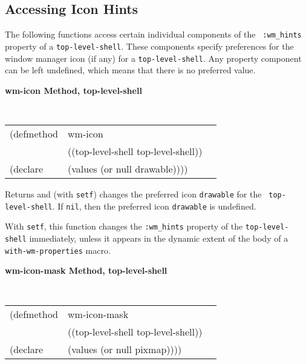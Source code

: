 \documentclass[twoside]{book}
\begin{document}
\begin{sloppy}
\begin{flushright}
{}\end{flushright}


{\samepage
\subsection*{Accessing Icon Hints} 

The following functions access certain individual components of the {\tt
:wm\_hints} property of a {\tt top\--level\--shell}. These components specify preferences
for the window manager icon (if any) for a {\tt top-level-shell}. Any property component
can be left undefined, which means that there is no preferred value.
}

{\samepage
{\large {\bf wm-icon \hfill Method, top-level-shell}}
\begin{flushright} \parbox[t]{6.125in}{
\tt
\begin{tabular}{lll}
\raggedright
(defmethod & wm-icon & \\
           & ((top-level-shell  top-level-shell)) \\
(declare   & (values (or null drawable))))
\end{tabular}
\rm

}\end{flushright}}

\begin{flushright} \parbox[t]{6.125in}{
Returns and (with {\tt setf}) changes the preferred icon {\tt drawable}
for the {\tt
top-level-shell}. If {\tt nil}, then the preferred icon {\tt drawable} is undefined.

With {\tt setf}, this function changes the {\tt :wm\_hints} property of
the {\tt top-level-shell} immediately, unless it appears in the dynamic extent of the
body of a {\tt with-wm-properties} macro.


}\end{flushright}

{\samepage
{\large {\bf wm-icon-mask \hfill Method, top-level-shell}}
\begin{flushright} \parbox[t]{6.125in}{
\tt
\begin{tabular}{lll}
\raggedright
(defmethod & wm-icon-mask & \\
           & ((top-level-shell  top-level-shell)) \\
(declare   & (values (or null pixmap))))
\end{tabular}
\rm

}
\end{flushright}}
\end{sloppy}
\end{document}
